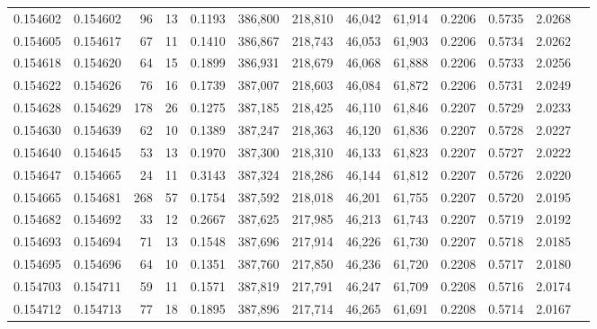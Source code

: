 \begin{tabular}{rrrrrrrrrrrrr}
0.154602 & 0.154602 &    96 &  13 &                                     0.1193 & 386,800 & 218,810 &  46,042 &  61,914 & 0.2206 & 0.5735 & 2.0268 \\
0.154605 & 0.154617 &    67 &  11 &                                     0.1410 & 386,867 & 218,743 &  46,053 &  61,903 & 0.2206 & 0.5734 & 2.0262 \\
0.154618 & 0.154620 &    64 &  15 &                                     0.1899 & 386,931 & 218,679 &  46,068 &  61,888 & 0.2206 & 0.5733 & 2.0256 \\
0.154622 & 0.154626 &    76 &  16 &                                     0.1739 & 387,007 & 218,603 &  46,084 &  61,872 & 0.2206 & 0.5731 & 2.0249 \\
0.154628 & 0.154629 &   178 &  26 &                                     0.1275 & 387,185 & 218,425 &  46,110 &  61,846 & 0.2207 & 0.5729 & 2.0233 \\
0.154630 & 0.154639 &    62 &  10 &                                     0.1389 & 387,247 & 218,363 &  46,120 &  61,836 & 0.2207 & 0.5728 & 2.0227 \\
0.154640 & 0.154645 &    53 &  13 &                                     0.1970 & 387,300 & 218,310 &  46,133 &  61,823 & 0.2207 & 0.5727 & 2.0222 \\
0.154647 & 0.154665 &    24 &  11 &                                     0.3143 & 387,324 & 218,286 &  46,144 &  61,812 & 0.2207 & 0.5726 & 2.0220 \\
0.154665 & 0.154681 &   268 &  57 &                                     0.1754 & 387,592 & 218,018 &  46,201 &  61,755 & 0.2207 & 0.5720 & 2.0195 \\
0.154682 & 0.154692 &    33 &  12 &                                     0.2667 & 387,625 & 217,985 &  46,213 &  61,743 & 0.2207 & 0.5719 & 2.0192 \\
0.154693 & 0.154694 &    71 &  13 &                                     0.1548 & 387,696 & 217,914 &  46,226 &  61,730 & 0.2207 & 0.5718 & 2.0185 \\
0.154695 & 0.154696 &    64 &  10 &                                     0.1351 & 387,760 & 217,850 &  46,236 &  61,720 & 0.2208 & 0.5717 & 2.0180 \\
0.154703 & 0.154711 &    59 &  11 &                                     0.1571 & 387,819 & 217,791 &  46,247 &  61,709 & 0.2208 & 0.5716 & 2.0174 \\
0.154712 & 0.154713 &    77 &  18 &                                     0.1895 & 387,896 & 217,714 &  46,265 &  61,691 & 0.2208 & 0.5714 & 2.0167 \\

\end{tabular}
